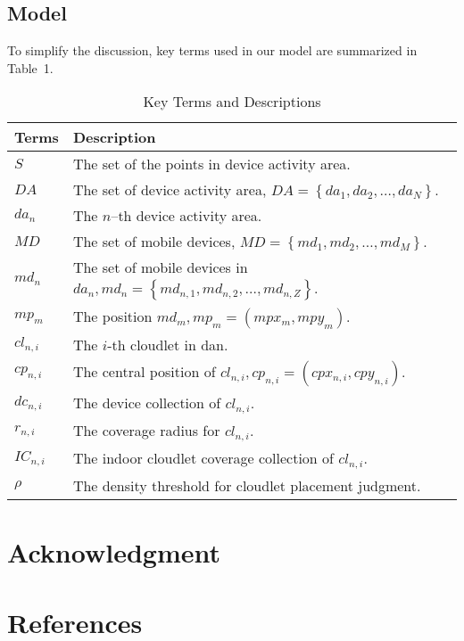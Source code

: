 \documentclass[10pt, conference, letterpaper]{IEEEtran}
\begin{document}
\subsection{Model}
To simplify the discussion, key terms used in our model are summarized in Table~1.
\begin{table}
\caption{Key Terms and Descriptions}
\begin{center}
\begin{tabular}{l@{\quad}l}
\hline
Terms & Description\\
\hline\rule{0pt}{12pt}
$S$ & The set of the points in device activity area.\\
$DA$ & The set of device activity area, $DA = \left\{da_{1}, da_{2},\dots, da_{N}\right\}$.\\
$da_{n}$ & The $n$--th device activity area.\\
$MD$ & The set of mobile devices, $MD = \left\{md_{1}, md_{2},\dots, md_{M}\right\}$.\\
$md_{n}$ & The set of mobile devices in $da_{n}, md_{n} = \left\{md_{n,1}, md_{n,2},\dots, md_{n,Z}\right\}$.\\
$mp_{m}$ & The position $md_{m}, mp_{m} = \left(mpx_{m}, mpy_{m}\right)$.\\
$cl_{n,i}$ & The $i$-th cloudlet in dan.\\
$cp_{n,i}$ & The central position of $cl_{n,i}, cp_{n,i} = \left(cpx_{n,i}, cpy_{n,i}\right)$.\\
$dc_{n,i}$ & The device collection of $cl_{n,i}$.\\
$r_{n,i}$ & The coverage radius for $cl_{n,i}$.\\
$IC_{n,i}$ & The indoor cloudlet coverage collection of $cl_{n,i}$.\\
$\rho$ & The density threshold for cloudlet placement judgment.\\[2pt]
\hline
\end{tabular}
\end{center}
\end{table}


\section*{Acknowledgment}



\section*{References}
\end{document}

